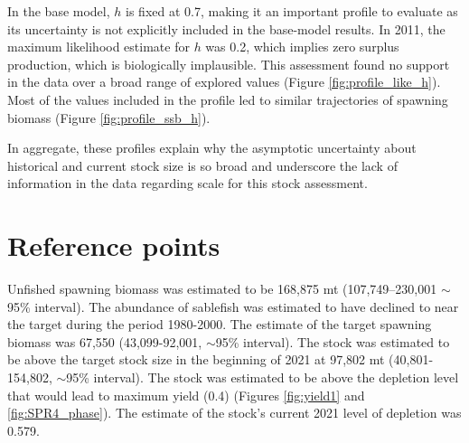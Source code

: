 \documentclass[11pt,
  english,
  a4paper,
]{article}
\begin{document}
\leavevmode\tagmcend\tagstructend\par

In the base model, {\(h\)\leavevmode\tagmcend\tagstructend} is fixed at 0.7, making it an important profile to evaluate as its uncertainty is not explicitly included in the base-model results. In 2011, the maximum likelihood estimate for {\(h\)\leavevmode\tagmcend\tagstructend} was 0.2, which implies zero surplus production, which is biologically implausible. This assessment found no support in the data over a broad range of explored values (Figure \ref{fig:profile_like_h}). Most of the values included in the profile led to similar trajectories of spawning biomass (Figure \ref{fig:profile_ssb_h}).

In aggregate, these profiles explain why the asymptotic uncertainty about historical and current stock size is so broad and underscore the lack of information in the data regarding scale for this stock assessment.

\leavevmode\tagmcend\tagstructend\par


\hypertarget{rp}{%
\section{Reference points}\label{rp}}

\leavevmode\tagmcend\tagstructend

Unfished spawning biomass was estimated to be 168,875 mt (107,749–230,001 $\sim$95\% interval). The abundance of sablefish was estimated to have declined to near the target during the period 1980-2000. The estimate of the target spawning biomass was 67,550 (43,099-92,001, $\sim$95\%  interval). The stock was estimated to be  above the target stock size in the beginning of 2021 at 97,802 mt (40,801-154,802, $\sim$95\% interval). The stock was estimated to be above the depletion level that would lead to maximum yield (0.4) (Figures \ref{fig:yield1} and \ref{fig:SPR4_phase}). The estimate of the stock's current 2021 level of depletion was 0.579.
\end{document}
